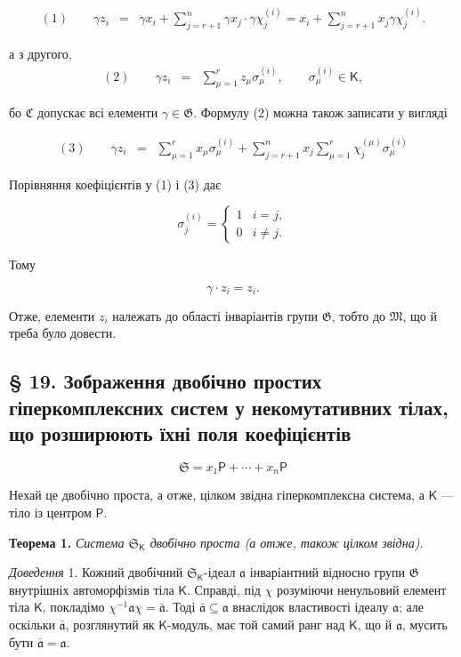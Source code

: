 \documentclass[11pt]{article}
\begin{document}
\[
\begin{array}{rcl}
(1)\qquad \gamma z_i
&=&\gamma x_i+\displaystyle\sum_{j=r+1}^{n}\gamma x_j\cdot \gamma\chi_j^{(i)}
=x_i+\displaystyle\sum_{j=r+1}^{n}x_j\gamma\chi_j^{(i)}.
\end{array}
\]

а з другого,
\[
\begin{array}{rcl}
(2)\qquad \gamma z_i&=&\displaystyle\sum_{\mu=1}^{r}z_\mu\sigma_\mu^{(i)},
\qquad \sigma_\mu^{(i)}\in\mathsf K,
\end{array}
\]

бо \(\mathfrak C\) допускає всі елементи \(\gamma\in\mathfrak G\). Формулу (2) можна також записати у вигляді

\[
\begin{array}{rcl}
(3)\qquad \gamma z_i
&=&\displaystyle\sum_{\mu=1}^{r}x_\mu\sigma_\mu^{(i)}
+\displaystyle\sum_{j=r+1}^{n}x_j\sum_{\mu=1}^{r}\chi_j^{(\mu)}\sigma_\mu^{(i)}
\end{array}
\]

Порівняння коефіцієнтів у (1) і (3) дає

\[
\sigma_j^{(i)}=
\begin{cases}
1 & i=j,\\
0 & i\ne j.
\end{cases}
\]

Тому

\[
\gamma\cdot z_i=z_i.
\]

Отже, елементи \(z_i\) належать до області інваріантів групи \(\mathfrak G\), тобто до \(\mathfrak M\), що й треба було довести.

\subsection*{§ 19. Зображення двобічно простих гіперкомплексних систем у некомутативних тілах, що розширюють їхні поля коефіцієнтів}\label{darstellungen-zweiseitig-einfacher-hyperkomplexer-systeme-in-nichtkommutativen-erweiterungskoerpern-ihrer-koeffizientenkoerper}

\[
\mathfrak S=x_1\mathsf P+\cdots+x_n\mathsf P
\]

Нехай це двобічно проста, а отже, цілком звідна гіперкомплексна система, а \(\mathsf K\) --- тіло із центром \(\mathsf P\).

\textbf{Теорема 1.} \emph{Система \(\mathfrak S_{\mathsf K}\) двобічно проста (а отже, також цілком звідна).}

\emph{Доведення} 1. Кожний двобічний \(\mathfrak S_{\mathsf K}\)-ідеал \(\mathfrak a\) інваріантний відносно групи \(\mathfrak G\) внутрішніх автоморфізмів тіла \(\mathsf K\). Справді, під \(\chi\) розуміючи ненульовий елемент тіла \(\mathsf K\), покладімо \(\chi^{-1}\mathfrak a\chi=\bar{\mathfrak a}\). Тоді \(\bar{\mathfrak a}\subseteq\mathfrak a\) внаслідок властивості ідеалу \(\mathfrak a\); але оскільки \(\bar{\mathfrak a}\), розглянутий як \(\mathsf K\)-модуль, має той самий ранг над \(\mathsf K\), що й \(\mathfrak a\), мусить бути \(\bar{\mathfrak a}=\mathfrak a\).
\end{document}
